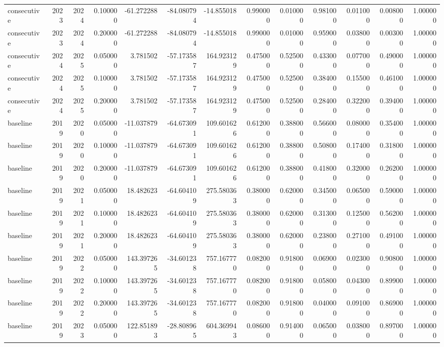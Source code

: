 \begin{tabular}{lrrrrrrrrrrrr}
consecutive & 2023 & 2024 & 0.100000 & -61.272288 & -84.080794 & -14.855018 & 0.990000 & 0.010000 & 0.981000 & 0.011000 & 0.008000 & 1.000000 \\
consecutive & 2023 & 2024 & 0.200000 & -61.272288 & -84.080794 & -14.855018 & 0.990000 & 0.010000 & 0.959000 & 0.038000 & 0.003000 & 1.000000 \\
consecutive & 2024 & 2025 & 0.050000 & 3.781502 & -57.173587 & 164.923129 & 0.475000 & 0.525000 & 0.433000 & 0.077000 & 0.490000 & 1.000000 \\
consecutive & 2024 & 2025 & 0.100000 & 3.781502 & -57.173587 & 164.923129 & 0.475000 & 0.525000 & 0.384000 & 0.155000 & 0.461000 & 1.000000 \\
consecutive & 2024 & 2025 & 0.200000 & 3.781502 & -57.173587 & 164.923129 & 0.475000 & 0.525000 & 0.284000 & 0.322000 & 0.394000 & 1.000000 \\
baseline & 2019 & 2020 & 0.050000 & -11.037879 & -64.673091 & 109.601626 & 0.612000 & 0.388000 & 0.566000 & 0.080000 & 0.354000 & 1.000000 \\
baseline & 2019 & 2020 & 0.100000 & -11.037879 & -64.673091 & 109.601626 & 0.612000 & 0.388000 & 0.508000 & 0.174000 & 0.318000 & 1.000000 \\
baseline & 2019 & 2020 & 0.200000 & -11.037879 & -64.673091 & 109.601626 & 0.612000 & 0.388000 & 0.418000 & 0.320000 & 0.262000 & 1.000000 \\
baseline & 2019 & 2021 & 0.050000 & 18.482623 & -64.604109 & 275.580363 & 0.380000 & 0.620000 & 0.345000 & 0.065000 & 0.590000 & 1.000000 \\
baseline & 2019 & 2021 & 0.100000 & 18.482623 & -64.604109 & 275.580363 & 0.380000 & 0.620000 & 0.313000 & 0.125000 & 0.562000 & 1.000000 \\
baseline & 2019 & 2021 & 0.200000 & 18.482623 & -64.604109 & 275.580363 & 0.380000 & 0.620000 & 0.238000 & 0.271000 & 0.491000 & 1.000000 \\
baseline & 2019 & 2022 & 0.050000 & 143.397265 & -34.601238 & 757.167770 & 0.082000 & 0.918000 & 0.069000 & 0.023000 & 0.908000 & 1.000000 \\
baseline & 2019 & 2022 & 0.100000 & 143.397265 & -34.601238 & 757.167770 & 0.082000 & 0.918000 & 0.058000 & 0.043000 & 0.899000 & 1.000000 \\
baseline & 2019 & 2022 & 0.200000 & 143.397265 & -34.601238 & 757.167770 & 0.082000 & 0.918000 & 0.040000 & 0.091000 & 0.869000 & 1.000000 \\
baseline & 2019 & 2023 & 0.050000 & 122.851893 & -28.808965 & 604.369943 & 0.086000 & 0.914000 & 0.065000 & 0.038000 & 0.897000 & 1.000000 \\

\end{tabular}
